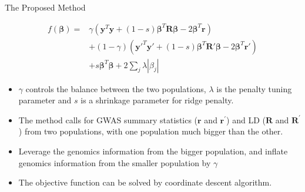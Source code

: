 \documentclass{beamer}
\begin{document}
\begin{frame}{The Proposed Method}

$$
    \begin{aligned}
f(\boldsymbol{\beta})=&\gamma\left(\boldsymbol{y}^{T} \boldsymbol{y}+(1-s)\boldsymbol{\beta}^{T} \boldsymbol{R} \boldsymbol{\beta} - 2\boldsymbol{\beta}^{T} \boldsymbol{r} \right)\\
& + (1-\gamma)\left(\boldsymbol{y'}^{T} \boldsymbol{y'}+(1-s)\boldsymbol{\beta}^{T} \boldsymbol{R'} \boldsymbol{\beta} - 2 \boldsymbol{\beta}^{T} \boldsymbol{r'}\right)\\ 
& + s\boldsymbol{\beta}^{T}\boldsymbol{\beta} + 2
\sum_j\lambda|\beta_j|
    \end{aligned}
$$ 

\pause
\small 
\begin{itemize}
    \item $\gamma$ controls the balance between the two populations, $\lambda$ is the penalty tuning parameter and $s$ is a shrinkage parameter for ridge penalty.
    \pause
    \item The method calls for GWAS summary statistics ($\boldsymbol{r}$ and $\boldsymbol{r}^{'}$) and LD ($\boldsymbol{R}$ and $\boldsymbol{R}^{'}$) from two populations, with one population much bigger than the other. 
    \pause
    \item Leverage the genomics information from the bigger population, and inflate genomics information from the smaller population by $\gamma$
    \pause
    \item The objective function can be solved by coordinate descent algorithm. 
\end{itemize}
\end{frame}

    
\end{document}

